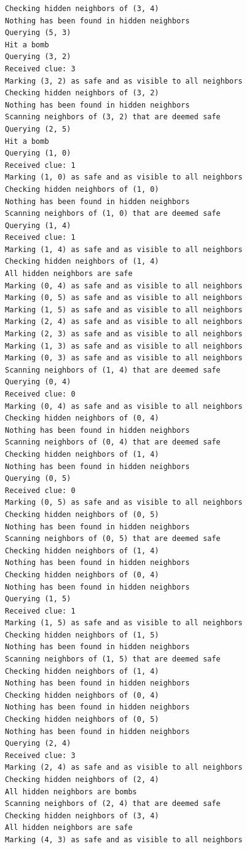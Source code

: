 \documentclass[13pt]{report}
\begin{document}
\begin{verbatim}
Checking hidden neighbors of (3, 4)
Nothing has been found in hidden neighbors
Querying (5, 3)
Hit a bomb
Querying (3, 2)
Received clue: 3
Marking (3, 2) as safe and as visible to all neighbors
Checking hidden neighbors of (3, 2)
Nothing has been found in hidden neighbors
Scanning neighbors of (3, 2) that are deemed safe
Querying (2, 5)
Hit a bomb
Querying (1, 0)
Received clue: 1
Marking (1, 0) as safe and as visible to all neighbors
Checking hidden neighbors of (1, 0)
Nothing has been found in hidden neighbors
Scanning neighbors of (1, 0) that are deemed safe
Querying (1, 4)
Received clue: 1
Marking (1, 4) as safe and as visible to all neighbors
Checking hidden neighbors of (1, 4)
All hidden neighbors are safe
Marking (0, 4) as safe and as visible to all neighbors
Marking (0, 5) as safe and as visible to all neighbors
Marking (1, 5) as safe and as visible to all neighbors
Marking (2, 4) as safe and as visible to all neighbors
Marking (2, 3) as safe and as visible to all neighbors
Marking (1, 3) as safe and as visible to all neighbors
Marking (0, 3) as safe and as visible to all neighbors
Scanning neighbors of (1, 4) that are deemed safe
Querying (0, 4)
Received clue: 0
Marking (0, 4) as safe and as visible to all neighbors
Checking hidden neighbors of (0, 4)
Nothing has been found in hidden neighbors
Scanning neighbors of (0, 4) that are deemed safe
Checking hidden neighbors of (1, 4)
Nothing has been found in hidden neighbors
Querying (0, 5)
Received clue: 0
Marking (0, 5) as safe and as visible to all neighbors
Checking hidden neighbors of (0, 5)
Nothing has been found in hidden neighbors
Scanning neighbors of (0, 5) that are deemed safe
Checking hidden neighbors of (1, 4)
Nothing has been found in hidden neighbors
Checking hidden neighbors of (0, 4)
Nothing has been found in hidden neighbors
Querying (1, 5)
Received clue: 1
Marking (1, 5) as safe and as visible to all neighbors
Checking hidden neighbors of (1, 5)
Nothing has been found in hidden neighbors
Scanning neighbors of (1, 5) that are deemed safe
Checking hidden neighbors of (1, 4)
Nothing has been found in hidden neighbors
Checking hidden neighbors of (0, 4)
Nothing has been found in hidden neighbors
Checking hidden neighbors of (0, 5)
Nothing has been found in hidden neighbors
Querying (2, 4)
Received clue: 3
Marking (2, 4) as safe and as visible to all neighbors
Checking hidden neighbors of (2, 4)
All hidden neighbors are bombs
Scanning neighbors of (2, 4) that are deemed safe
Checking hidden neighbors of (3, 4)
All hidden neighbors are safe
Marking (4, 3) as safe and as visible to all neighbors

\end{verbatim}
\end{document}
